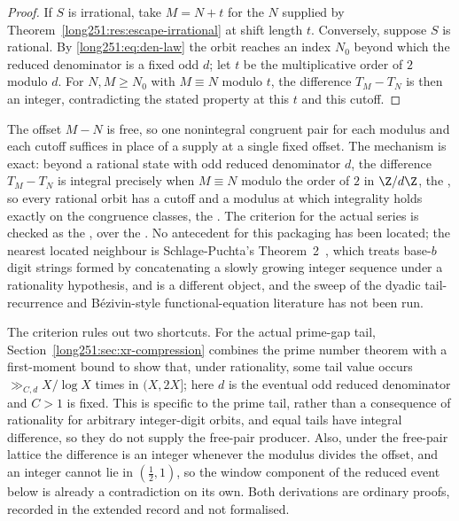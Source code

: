 \documentclass[11pt]{article}
\begin{document}
\begin{proof}
If $S$ is irrational, take $M=N+t$ for the $N$ supplied by
Theorem~\ref{long251:res:escape-irrational} at shift length $t$.  Conversely, suppose
$S$ is rational.  By \eqref{long251:eq:den-law} the orbit reaches an index $N_0$ beyond
which the reduced denominator is a fixed odd $d$; let $t$ be the
multiplicative order of $2$ modulo $d$.  For $N,M\ge N_0$ with $M\equiv N$
modulo $t$, the difference $T_M-T_N$ is then an integer, contradicting the
stated property at this $t$ and this cutoff.
\end{proof}

\noindent The offset $M-N$ is free, so one nonintegral congruent pair for each
modulus and each cutoff suffices in place of a supply at a single fixed offset.
The mechanism is exact: beyond a rational state with odd reduced denominator
$d$, the difference $T_M-T_N$ is integral precisely when $M\equiv N$ modulo the
order of $2$ in $\Z/d\Z$, the
, so every rational orbit has a cutoff and a modulus at which
integrality holds exactly on the congruence classes, the
.  The criterion for the actual series is checked as the
, over the
.  No antecedent for this packaging has been located; the
nearest located neighbour is Schlage-Puchta's
Theorem~2~\cite{schlagepuchta2011}, which treats base-$b$ digit strings formed
by concatenating a slowly growing integer sequence under a rationality hypothesis,
and is a different object, and the sweep of the dyadic
tail-recurrence and B\'ezivin-style functional-equation literature has not been
run.

The criterion rules out two shortcuts.  For the actual prime-gap tail,
Section~\ref{long251:sec:xr-compression} combines the prime number theorem with
a first-moment bound to show that, under rationality, some tail value occurs
$\gg_{C,d}X/\log X$ times in $(X,2X]$; here $d$ is the eventual odd reduced
denominator and $C>1$ is fixed.  This is specific to the prime tail, rather
than a consequence of rationality for arbitrary integer-digit orbits, and
equal tails have integral difference, so they do not supply the free-pair
producer.  Also, under the free-pair lattice the difference is an integer
whenever the modulus divides the offset, and an integer cannot lie in
$(\tfrac12,1)$, so the window component of the reduced event below is already
a contradiction on its own.  Both derivations are ordinary proofs, recorded
in the extended record and not formalised.
\end{document}
